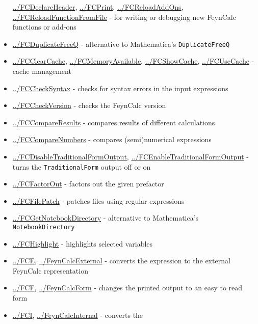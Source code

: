 \documentclass[../FeynCalcManual.tex]{subfiles}
\begin{document}
\begin{itemize}
  \hyperlink{../fcdeclareheader}{../FCDeclareHeader},
  \hyperlink{../fcprint}{../FCPrint},
  \hyperlink{../fcreloadaddons}{../FCReloadAddOns},
  \hyperlink{../fcreloadfunctionfromfile}{../FCReloadFunctionFromFile} -
  for writing or debugging new FeynCalc functions or add-ons
\item
  \hyperlink{../fcduplicatefreeq}{../FCDuplicateFreeQ} - alternative to
  Mathematica's \texttt{DuplicateFreeQ}
\item
  \hyperlink{../fcclearcache}{../FCClearCache},
  \hyperlink{../fcmemoryavailable}{../FCMemoryAvailable},
  \hyperlink{../fcshowcache}{../FCShowCache},
  \hyperlink{../fcusecache}{../FCUseCache} - cache management
\item
  \hyperlink{../fcchecksyntax}{../FCCheckSyntax} - checks for syntax
  errors in the input expressions
\item
  \hyperlink{../fccheckversion}{../FCCheckVersion} - checks the FeynCalc
  version
\item
  \hyperlink{../fccompareresults}{../FCCompareResults} - compares
  results of different calculations
\item
  \hyperlink{../fccomparenumbers}{../FCCompareNumbers} - compares
  (semi)numerical expressions
\item
  \hyperlink{../fcdisabletraditionalformoutput}{../FCDisableTraditionalFormOutput},
  \hyperlink{../fcenabletraditionalformoutput}{../FCEnableTraditionalFormOutput}
  - turns the \texttt{TraditionalForm} output off or on
\item
  \hyperlink{../fcfactorout}{../FCFactorOut} - factors out the given
  prefactor
\item
  \hyperlink{../fcfilepatch}{../FCFilePatch} - patches files using
  regular expressions
\item
  \hyperlink{../fcgetnotebookdirectory}{../FCGetNotebookDirectory} -
  alternative to Mathematica's \texttt{NotebookDirectory}
\item
  \hyperlink{../fchighlight}{../FCHighlight} - highlights selected
  variables
\item
  \hyperlink{../fce}{../FCE},
  \hyperlink{../feyncalcexternal}{../FeynCalcExternal} - converts the
  expression to the external FeynCalc representation
\item
  \hyperlink{../fcf}{../FCF},
  \hyperlink{../feyncalcform}{../FeynCalcForm} - changes the printed
  output to an easy to read form
\item
  \hyperlink{../fci}{../FCI},
  \hyperlink{../feyncalcinternal}{../FeynCalcInternal} - converts the

\end{itemize}
\end{document}
